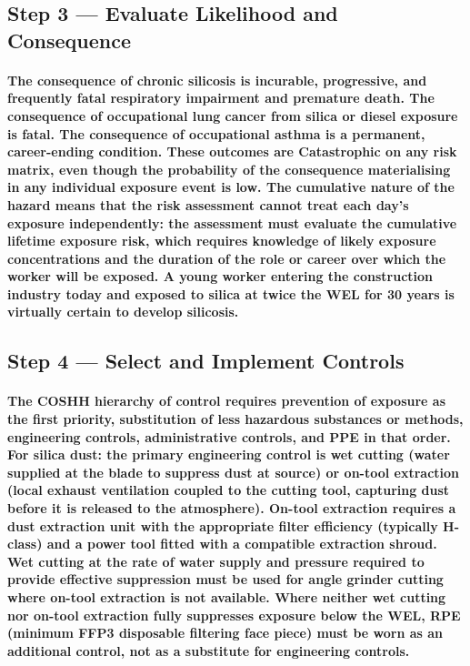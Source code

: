 \subsection{Step 3 --- Evaluate Likelihood and Consequence}
\paragraph{The consequence of chronic silicosis is incurable, progressive, and frequently fatal respiratory impairment and premature death. The consequence of occupational lung cancer from silica or diesel exposure is fatal. The consequence of occupational asthma is a permanent, career-ending condition. These outcomes are Catastrophic on any risk matrix, even though the probability of the consequence materialising in any individual exposure event is low. The cumulative nature of the hazard means that the risk assessment cannot treat each day's exposure independently: the assessment must evaluate the cumulative lifetime exposure risk, which requires knowledge of likely exposure concentrations and the duration of the role or career over which the worker will be exposed. A young worker entering the construction industry today and exposed to silica at twice the WEL for 30 years is virtually certain to develop silicosis.}

\subsection{Step 4 --- Select and Implement Controls}
\paragraph{The COSHH hierarchy of control requires prevention of exposure as the first priority, substitution of less hazardous substances or methods, engineering controls, administrative controls, and PPE in that order. For silica dust: the primary engineering control is wet cutting (water supplied at the blade to suppress dust at source) or on-tool extraction (local exhaust ventilation coupled to the cutting tool, capturing dust before it is released to the atmosphere). On-tool extraction requires a dust extraction unit with the appropriate filter efficiency (typically H-class) and a power tool fitted with a compatible extraction shroud. Wet cutting at the rate of water supply and pressure required to provide effective suppression must be used for angle grinder cutting where on-tool extraction is not available. Where neither wet cutting nor on-tool extraction fully suppresses exposure below the WEL, RPE (minimum FFP3 disposable filtering face piece) must be worn as an additional control, not as a substitute for engineering controls.}

